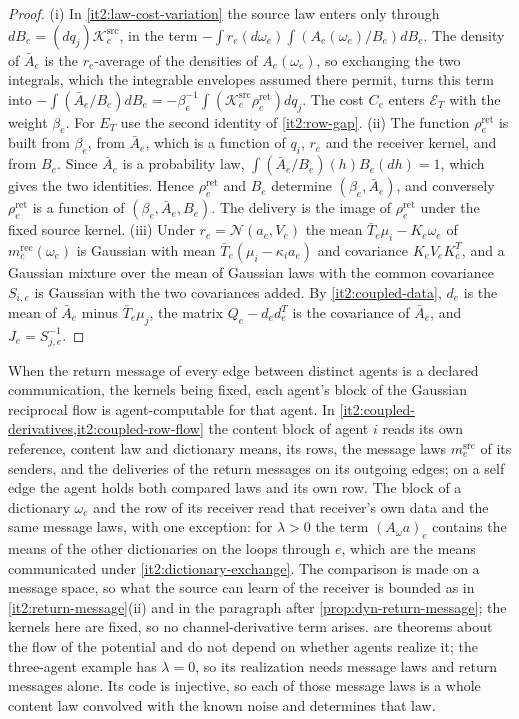 \begin{proof}
(i) In \cref{it2:law-cost-variation} the source law enters only through $dB_e=(dq_j)\mathcal K_e^{\mathrm{src}}$, in the term $-\int r_e(d\omega_e)\int(A_e(\omega_e)/B_e)dB_e$. The density of $\bar A_e$ is the $r_e$-average of the densities of $A_e(\omega_e)$, so exchanging the two integrals, which the integrable envelopes assumed there permit, turns this term into $-\int(\bar A_e/B_e)dB_e=-\beta_e^{-1}\int(\mathcal K_e^{\mathrm{src}}\rho_e^{\mathrm{ret}})dq_j$. The cost $C_e$ enters $\mathcal E_T$ with the weight $\beta_e$. For $E_T$ use the second identity of \cref{it2:row-gap}. (ii) The function $\rho_e^{\mathrm{ret}}$ is built from $\beta_e$, from $\bar A_e$, which is a function of $q_i$, $r_e$ and the receiver kernel, and from $B_e$. Since $\bar A_e$ is a probability law, $\int(\bar A_e/B_e)(h)B_e(dh)=1$, which gives the two identities. Hence $\rho_e^{\mathrm{ret}}$ and $B_e$ determine $(\beta_e,\bar A_e)$, and conversely $\rho_e^{\mathrm{ret}}$ is a function of $(\beta_e,\bar A_e,B_e)$. The delivery is the image of $\rho_e^{\mathrm{ret}}$ under the fixed source kernel. (iii) Under $r_e=\mathcal N(a_e,V_e)$ the mean $\bar T_e\mu_i-K_e\omega_e$ of $m_e^{\mathrm{rec}}(\omega_e)$ is Gaussian with mean $\bar T_e(\mu_i-\kappa_ia_e)$ and covariance $K_eV_eK_e^T$, and a Gaussian mixture over the mean of Gaussian laws with the common covariance $S_{i,e}$ is Gaussian with the two covariances added. By \cref{it2:coupled-data}, $d_e$ is the mean of $\bar A_e$ minus $\bar T_e\mu_j$, the matrix $Q_e-d_ed_e^T$ is the covariance of $\bar A_e$, and $J_e=S_{j,e}^{-1}$.
\end{proof}

When the return message of every edge between distinct agents is a declared communication, the kernels being fixed, each agent's block of the Gaussian reciprocal flow is agent-computable for that agent. In \cref{it2:coupled-derivatives,it2:coupled-row-flow} the content block of agent $i$ reads its own reference, content law and dictionary means, its rows, the message laws $m_e^{\mathrm{src}}$ of its senders, and the deliveries of the return messages on its outgoing edges; on a self edge the agent holds both compared laws and its own row. The block of a dictionary $\omega_e$ and the row of its receiver read that receiver's own data and the same message laws, with one exception: for $\lambda>0$ the term $(A_\omega a)_e$ contains the means of the other dictionaries on the loops through $e$, which are the means communicated under \cref{it2:dictionary-exchange}. The comparison is made on a message space, so what the source can learn of the receiver is bounded as in \cref{it2:return-message}(ii) and in the paragraph after \cref{prop:dyn-return-message}; the kernels here are fixed, so no channel-derivative term arises.  are theorems about the flow of the potential and do not depend on whether agents realize it; the three-agent example has $\lambda=0$, so its realization needs message laws and return messages alone. Its code is injective, so each of those message laws is a whole content law convolved with the known noise and determines that law.


